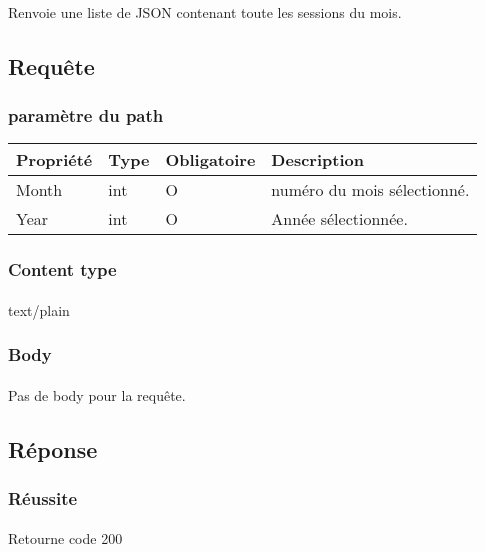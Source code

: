\paragraph{}
	Renvoie une liste de JSON contenant toute les sessions du mois.

\subsection{Requête}
	\subsubsection{paramètre du path}
		\begin{center}
			\begin{tabularx}{\textwidth}{| T{0.2122\textwidth} | S{0.22\textwidth} | S{0.15\textwidth} | S{0.3\textwidth} |}
				\hline
				Propriété & Type & Obligatoire & Description \\
				\hline
				Month & int & O & numéro du mois sélectionné. \\
				\hline
				Year & int & O & Année sélectionnée. \\
				\hline
			\end{tabularx}
		\end{center}
		
	\subsubsection{Content type}
		\paragraph{}
			text/plain
			
	\subsubsection{Body}
		\paragraph{}
			Pas de body pour la requête.

\subsection{Réponse}
	\subsubsection{Réussite}
		\paragraph{}
			Retourne code 200
			
